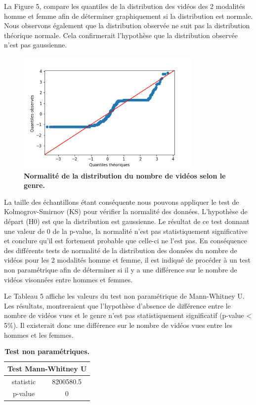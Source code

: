 \documentclass[12pt, a4paper, titlepage, table]{article}
\begin{document}
La Figure 5, compare les quantiles de la distribution des vidéos des 2 modalités homme et femme afin de déterminer graphiquement si la distribution est normale. Nous observons également que la distribution observée ne suit pas la distribution théorique normale. Cela confirmerait l'hypothèse que la distribution observée n'est pas gaussienne.


  	\begin{figure}[H]
  		\centering
  		\includegraphics[width=0.8\textwidth]{../../graph/distribution_video3.png}
  		\caption{\textbf{Normalité de la distribution du nombre de vidéos selon le genre.}}
  	\end{figure}
  
La taille des échantillons étant conséquente nous pouvons appliquer le test de   Kolmogrov-Smirnov (KS) pour vérifier la normalité des données. L'hypothèse de départ (H0) est que la distribution est gaussienne.
Le résultat de ce test donnant une valeur de 0 de la p-value, la normalité n'est pas statistiquement significative et conclure qu'il est fortement probable que celle-ci ne l'est pas.   
En conséquence des différents tests de normalité de la distribution des données du nombre de vidéos pour les 2 modalités homme et femme, il est indiqué de procéder à un test non paramétrique afin de déterminer si il y a une différence sur le nombre de vidéos visonnées entre hommes et femmes. 

Le Tableau 5 affiche les valeurs du test non paramétrique de Mann-Whitney U. Les résultats, montreraient que l'hypothèse d'absence de différence entre le nombre de vidéos vues et le genre n'est pas statistiquement significatif (p-value < 5\%). Il existerait donc une différence sur le nombre de vidéos vues entre les hommes et les femmes.

\begin{table}[H]
	\centering
	\fontsize{12}{20}\selectfont
	\begin{tabular}{|c|c|}
		\hline
		\multicolumn{2}{|c|}{\textbf{Test Mann-Whitney U}}\\ 
		\hline 
		statistic& 8200580.5\\
		p-value& 0\\
		\hline
	\end{tabular}
\caption{\textbf{Test non paramétriques.}}
\end{table}
\end{document}
